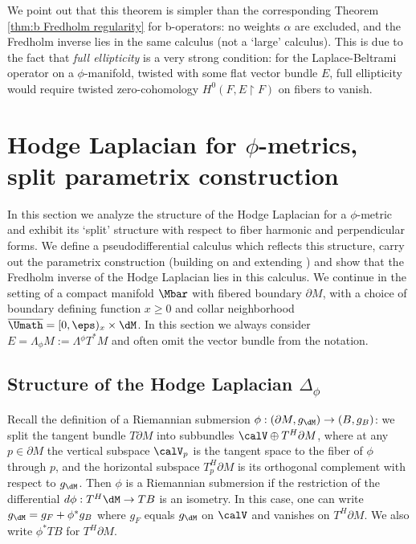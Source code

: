 We point out that this theorem is simpler than the corresponding Theorem \ref{thm:b Fredholm regularity} for b-operators: no weights $\alpha$ are excluded, and the Fredholm inverse lies in the same calculus (not a `large' calculus).
This is due to the fact that \emph{full ellipticity} is a very strong condition: \eg for the Laplace-Beltrami operator on a $\phi$-manifold, twisted with some flat vector bundle $E$, full ellipticity would require
twisted zero-cohomology $H^0(F,E\restriction F)$ on fibers to vanish.

\section{Hodge Laplacian for \texorpdfstring{$\phi$}{phi}-metrics, split parametrix construction}\label{sec:split}
In this section we analyze the structure of the Hodge Laplacian for a $\phi$-metric and exhibit its `split' structure with respect to fiber harmonic and perpendicular forms.
We define a pseudodifferential calculus which reflects this structure, carry out the parametrix construction (building on and extending \cite{grieser-para}) and show that the Fredholm inverse of the Hodge Laplacian lies in this calculus. We continue in the setting
of a compact manifold $\Mbar$ with fibered boundary $\partial M$, with a choice of boundary defining function $x \geq 0$ and collar neighborhood $\overline{\Umath}=[0,\eps)_x\times\dM$. In this section we always consider
$E= \Lambda_\phi M:=\Lambda {}^\phi T^*M$ and often omit the vector bundle from the notation.

\subsection{Structure of the Hodge Laplacian \texorpdfstring{$\Delta_{\phi}$}{Delta}}\label{subsec:str hodge}
Recall the definition of a Riemannian submersion $\phi: (\partial M, g_\dM)
\to (B, g_B)$: we split the tangent bundle $T\partial M$
into subbundles $\calV\oplus T^H \partial M$, where at any $p\in \partial M$
the vertical subspace $\calV_p$ is the tangent
space to the fiber of $\phi$ through $p$, and the horizontal subspace $T^H_p \partial M$ is its orthogonal complement with respect to $g_\dM$.
Then $\phi$ is a Riemannian submersion if the restriction of the differential $d\phi:T^H\dM \to TB$ is an isometry. In this case, one can write $g_\dM=g_F + \phi^*g_B$ where $g_{F}$ equals $g_{\dM}$ on $\calV$ and vanishes on $T^H \partial M$.
We also write $\phi^*TB$ for $T^H \partial M$.

